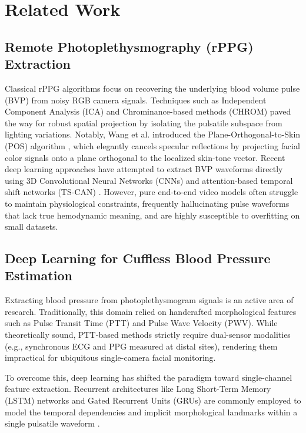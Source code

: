 \section{Related Work}

\subsection{Remote Photoplethysmography (rPPG) Extraction}
Classical rPPG algorithms focus on recovering the underlying blood volume pulse (BVP) from noisy RGB camera signals. Techniques such as Independent Component Analysis (ICA) and Chrominance-based methods (CHROM) paved the way for robust spatial projection by isolating the pulsatile subspace from lighting variations. Notably, Wang et al. introduced the Plane-Orthogonal-to-Skin (POS) algorithm \cite{wang2016pos}, which elegantly cancels specular reflections by projecting facial color signals onto a plane orthogonal to the localized skin-tone vector. Recent deep learning approaches have attempted to extract BVP waveforms directly using 3D Convolutional Neural Networks (CNNs) and attention-based temporal shift networks (TS-CAN) \cite{liu2020tscan}. However, pure end-to-end video models often struggle to maintain physiological constraints, frequently hallucinating pulse waveforms that lack true hemodynamic meaning, and are highly susceptible to overfitting on small datasets.

\subsection{Deep Learning for Cuffless Blood Pressure Estimation}
Extracting blood pressure from photoplethysmogram signals is an active area of research. Traditionally, this domain relied on handcrafted morphological features such as Pulse Transit Time (PTT) and Pulse Wave Velocity (PWV). While theoretically sound, PTT-based methods strictly require dual-sensor modalities (e.g., synchronous ECG and PPG measured at distal sites), rendering them impractical for ubiquitous single-camera facial monitoring. 

To overcome this, deep learning has shifted the paradigm toward single-channel feature extraction. Recurrent architectures like Long Short-Term Memory (LSTM) networks and Gated Recurrent Units (GRUs) are commonly employed to model the temporal dependencies and implicit morphological landmarks within a single pulsatile waveform \cite{slapnicar2019blood}.

